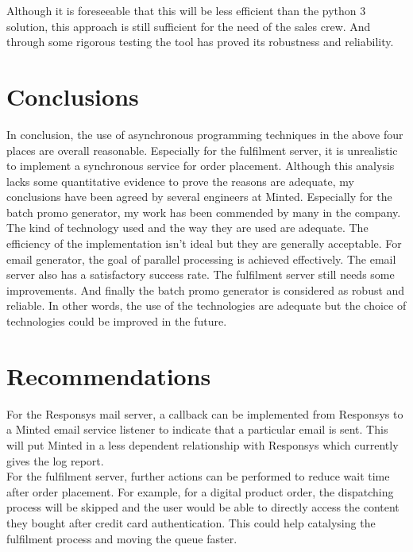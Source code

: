\documentclass[12pt]{article}
\begin{document}
Although it is foreseeable that this will be less efficient than the python 3 solution, this approach is still sufficient for the need of the sales crew. And through some rigorous testing the tool has proved its robustness and reliability.\\


\newpage
\section{Conclusions}
In conclusion, the use of asynchronous programming techniques in the above four places are overall reasonable. Especially for the fulfilment server, it is unrealistic to implement a synchronous service for order placement. Although this analysis lacks some quantitative evidence to prove the reasons are adequate, my conclusions have been agreed by several engineers at Minted. Especially for the batch promo generator, my work has been commended by many in the company.\\

The kind of technology used and the way they are used are adequate. The efficiency of the implementation isn't ideal but they are generally acceptable. For email generator, the goal of parallel processing is achieved effectively. The email server also has a satisfactory success rate. The fulfilment server still needs some improvements. And finally the batch promo generator is considered as robust and reliable. In other words, the use of the technologies are adequate but the choice of technologies could be improved in the future.\\

\newpage
\section{Recommendations}
For the Responsys mail server, a callback can be implemented from Responsys to a Minted email service listener to indicate that a particular email is sent. This will put Minted in a less dependent relationship with Responsys which currently gives the log report.\\

For the fulfilment server, further actions can be performed to reduce wait time after order placement. For example, for a digital product order, the dispatching process will be skipped and the user would be able to directly access the content they bought after credit card authentication. This could help catalysing the fulfilment process and moving the queue faster.\\
\end{document}
